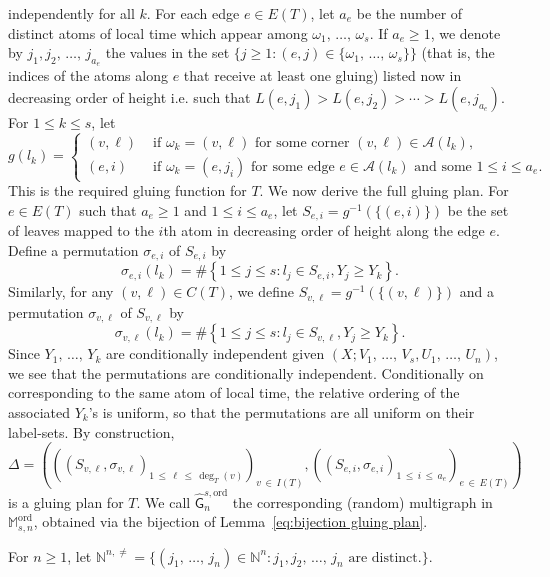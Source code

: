 \documentclass[10pt]{amsart}
\theoremstyle{definition}\newtheorem{defi}[theo]{Definition}\newtheorem{rema}[theo]{Remark}\newtheorem{exam}[theo]{Example}\newtheorem{exem}[theo]{Example}\newtheorem{nota}[theo]{Notation}
\newcommand{\ord}{\mathrm{ord}}
\newcommand{\cA}{\mathcal{A}}
\newcommand{\sG}{\mathsf{G}}
\newcommand{\M}{\mathbb{M}}
\newcommand{\N}{\mathbb{N}}
\begin{document}
independently for all $k$. For each edge $e\in E(T)$, let $a_e$ be the number of distinct atoms of local time which appear among $\omega_1,\,\ldots,\,\omega_s$. If $a_e \ge 1$, we denote by $j_1,j_2,\,\dots,\, j_{a_e}$ the values in the set $\{j\geq 1: (e,j)\in \{\omega_1,\,\ldots,\,\omega_s\}\}$ (that is, the indices of the atoms along $e$ that receive at least one gluing) listed now in decreasing order of height i.e. such that $L(e, j_1) > L(e, j_2) > \cdots > L(e, j_{a_e})$. For $1 \le k \le s$, let
\[
g(l_k) =
\begin{cases}
(v,\ell) & \text{ if $\omega_k = (v,\ell)$ for some corner $(v,\ell) \in \cA(l_k)$,} \\
(e,i) & \text{ if $\omega_k = (e, j_{i})$ for some edge $e \in \cA(l_k)$ and some $1 \le i \le a_e$}.
\end{cases}
\]
This is the required gluing function for $T$. We now derive the full gluing plan. For $e \in E(T)$ such that $a_e \ge 1$ and $1 \le i \le a_e$, let $S_{e,i} = g^{-1}(\{(e,i)\})$ be the set of leaves mapped to the $i$th atom in decreasing order of height along the edge $e$. Define a permutation $\sigma_{e,i}$ of $S_{e,i}$ by
\[
\sigma_{e,i}(l_k) = \#\left\{1 \le j \le s: l_j \in S_{e,i}, Y_j \ge Y_k\right\}.
\]
Similarly, for any $(v,\ell)\in C(T)$, we define $S_{v,\ell} = g^{-1}(\{(v,\ell)\})$ and a permutation $\sigma_{v,\ell}$ of $S_{v,\ell}$ by
\[
\sigma_{v,\ell}(l_k)= \#\left\{1\leq j\leq s: l_j\in S_{v,\ell}, Y_j \geq Y_k\right\}.
\]
Since $Y_1,\,\ldots,\,Y_k$ are conditionally independent given $(X; V_1,\,\ldots,\,V_s, U_1, \,\ldots,\,U_n)$, we see that the permutations are conditionally independent. Conditionally on corresponding to the same atom of local time, the relative ordering of the associated $Y_k$'s is uniform, so that the permutations are all uniform on their label-sets. By construction,
\[
\Delta=\left(\left(\left(S_{v,\ell}, \sigma_{v,\ell}\right)_{1\,\le\,\ell\,\le\,\deg_T(v)} \right)_{v\,\in\,I(T)}, \left(\left(S_{e,i},\sigma_{e,i}\right)_{1\,\le\,i\,\le\,a_e} \right)_{e\,\in\,E(T)} \right)
\]
is a gluing plan for $T$. We call $\widehat{\sG}_{n}^{s,\ord}$ the corresponding (random) multigraph in $\M_{s,n}^{\ord}$, obtained via the bijection of Lemma~\ref{eq:bijection gluing plan}.

For $n \ge 1$, let $\N^{n, \neq} = \{(j_1,\,\ldots, \,j_n) \in \N^n:  j_1, j_2,\,\ldots,\, j_n\text{ are distinct.} \}$.
\end{document}
